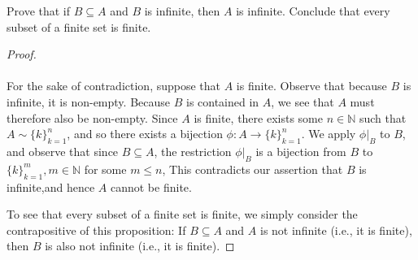 Prove that if $B\subseteq A$ and $B$ is infinite, then $A$ is infinite. 
Conclude that every subset of a finite set is finite.

\begin{proof}\ \\\\
    For the sake of contradiction, suppose that $A$ is finite. Observe that
    because $B$ is infinite, it is non-empty. Because $B$ is contained in $A$,
    we see that $A$ must therefore also be non-empty. Since $A$ is finite, there
    exists some $n \in \mathbb{N}$ such that $A \sim \{k\}_{k=1}^n$, and so
    there exists a bijection $\phi:A \to \{k\}_{k=1}^n$. We apply $\phi\vert_B$
    to $B$, and observe that since $B \subseteq A$, the restriction 
    $\phi\vert_B$ is a bijection from $B$ to $\{k\}_{k=1}^m, m \in \mathbb{N}$
    for some $m \le n$, This contradicts our assertion that $B$ is 
    infinite,\footnotemark and hence $A$ cannot be finite.

    To see that every subset of a finite set is finite, we simply consider the
    contrapositive of this proposition: If $B \subseteq A$ and $A$ is not
    infinite (i.e., it is finite), then $B$ is also not infinite (i.e., it is
    finite).
    
\end{proof}